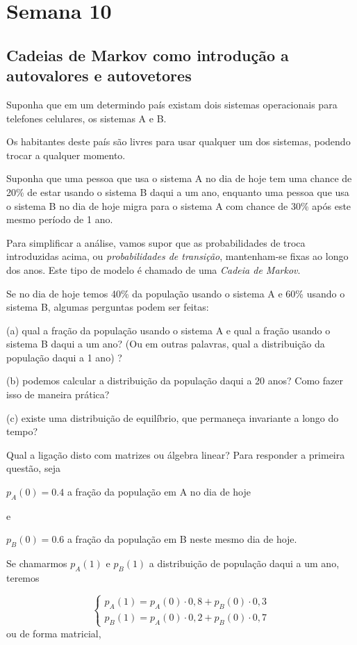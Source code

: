 \documentclass[../livro.tex]{subfiles}  %
\begin{document}
\chapter{Semana 10}


\section{Cadeias de Markov como introdução a autovalores e autovetores}

Suponha que em um determindo país existam dois sistemas operacionais para telefones celulares, os sistemas A e B.

Os habitantes deste país são livres para usar qualquer um dos sistemas, podendo trocar a qualquer momento.

Suponha que uma pessoa que usa o sistema A no dia de hoje tem uma chance de  20\% de estar usando  o sistema B daqui a um ano, enquanto uma pessoa que usa o sistema B no dia de hoje migra para o sistema A com chance de 30\% após este mesmo período de 1 ano.

Para simplificar a análise, vamos supor que as probabilidades de troca introduzidas acima, ou  {\it probabilidades de transição}, mantenham-se fixas ao longo dos anos.
Este tipo de modelo é chamado de uma {\it Cadeia de Markov}.

Se no dia de hoje temos 40\% da população usando o sistema A e 60\% usando o sistema B, algumas perguntas podem ser feitas:

\medskip


(a) qual a fração da população usando o sistema A e qual a fração usando o sistema B daqui a um ano? (Ou em outras palavras, qual a distribuição da população daqui a 1 ano) ?

(b) podemos calcular a distribuição da população daqui a 20 anos? Como fazer isso de maneira prática?

(c) existe uma distribuição de equilíbrio, que permaneça invariante a longo do tempo?

\medskip
Qual a ligação disto com matrizes ou álgebra linear?
Para responder a primeira questão, seja
\medskip

$p_A(0)=0.4$ a fração da população em A no dia de hoje

e

$p_B(0)=0.6$ a fração da população em B neste mesmo dia de hoje.

Se chamarmos $p_A(1)$ e $p_B(1)$ a distribuição de população daqui a um ano, teremos

\begin{equation}\label{cmark-1}
\begin{cases}
p_A(1)=p_A(0) \cdot 0,8 + p_B(0) \cdot 0,3 \\
p_B(1)=p_A(0) \cdot 0,2 + p_B(0) \cdot 0,7
\end{cases}
\end{equation}
ou de forma  matricial,
\end{document}
